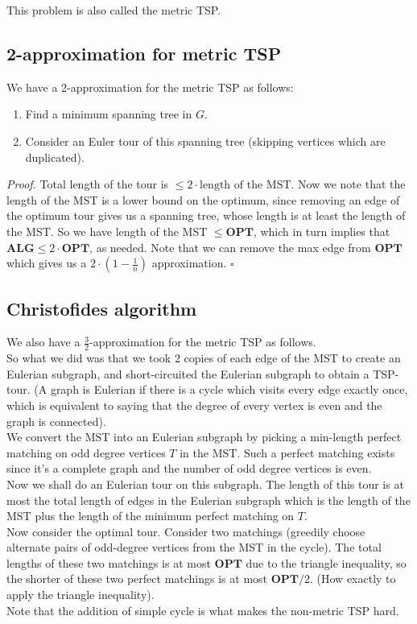 \documentclass[a4paper]{article}
\newenvironment{proof}{\begin{breakbox}\textit{Proof.}}{\hfill$\square$\end{breakbox}}
\newcommand{\nl}{\vspace{0.2cm}\\}
\newcommand{\OPT}{\mathbf{OPT}}
\newcommand{\ALG}{\mathbf{ALG}}
\begin{document}
This problem is also called the metric TSP.\nl

\subsection{2-approximation for metric TSP}

We have a 2-approximation for the metric TSP as follows:

\begin{enumerate}
    \item Find a minimum spanning tree in $G$.
    \item Consider an Euler tour of this spanning tree (skipping vertices which are duplicated).
\end{enumerate}

\begin{proof}
    Total length of the tour is $\le 2 \cdot \text{length of the MST}$. Now we note that the length of the MST is a lower bound on the optimum, since removing an edge of the optimum tour gives
    us a spanning tree, whose length is at least the length of the MST. So we have length of the MST $\le \OPT$, which in turn implies that $\ALG \le 2 \cdot \OPT$, as needed. Note that we can
    remove the max edge from $\OPT$ which gives us a $2 \cdot \left(1 - \frac{1}{n}\right)$ approximation.
\end{proof}

\subsection{Christofides algorithm}
We also have a $\frac{3}{2}$-approximation for the metric TSP as follows.\nl
So what we did was that we took 2 copies of each edge of the MST to create an Eulerian subgraph, and short-circuited the Eulerian subgraph to obtain a TSP-tour. (A graph is Eulerian if there is a
cycle which visits every edge exactly once, which is equivalent to saying that the degree of every vertex is even and the graph is connected).\nl
We convert the MST into an Eulerian subgraph by picking a min-length perfect matching on odd degree vertices $T$ in the MST. Such a perfect matching exists since it's a complete graph and the number of odd degree
vertices is even.\nl
Now we shall do an Eulerian tour on this subgraph. The length of this tour is at most the total length of edges in the Eulerian subgraph which is the length of the MST plus the length of the
minimum perfect matching on $T$.\nl
Now consider the optimal tour. Consider two matchings (greedily choose alternate pairs of odd-degree vertices from the MST in the cycle). The total lengths of these two matchings is at most $\OPT$ due to
the triangle inequality, so the shorter of these two perfect matchings is at most $\OPT/2$. (How exactly to apply the triangle inequality).\nl
Note that the addition of simple cycle is what makes the non-metric TSP hard.
\end{document}
